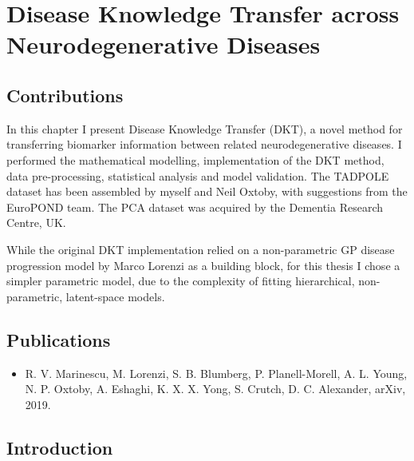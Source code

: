 \chapter{Disease Knowledge Transfer across Neurodegenerative Diseases}
\label{chapter:dkt}

\newcommand{\expFld}{./jointModellingDisease/resfiles/tad-drcTiny_JMD}
\newcommand{\jmdFld}{./jointModellingDisease}


\section{Contributions}

In this chapter I present Disease Knowledge Transfer (DKT), a novel method for transferring biomarker information between related neurodegenerative diseases. I performed the mathematical modelling, implementation of the DKT method, data pre-processing, statistical analysis and model validation. The TADPOLE dataset has been assembled by myself and Neil Oxtoby, with suggestions from the EuroPOND team. The PCA dataset was acquired by the Dementia Research Centre, UK. 

While the original DKT implementation relied on a non-parametric GP disease progression model by Marco Lorenzi \cite{lorenzi2017disease} as a building block, for this thesis I chose a simpler parametric model, due to the complexity of fitting hierarchical, non-parametric, latent-space models.

\section{Publications}
\begin{itemize}
 \item R. V. Marinescu, M. Lorenzi, S. B. Blumberg, P. Planell-Morell, A. L. Young, N. P. Oxtoby,  A. Eshaghi, K. X. X. Yong, S. Crutch, D. C. Alexander, arXiv, 2019.
\end{itemize}


\section{Introduction}
\label{sec:dktInt}


